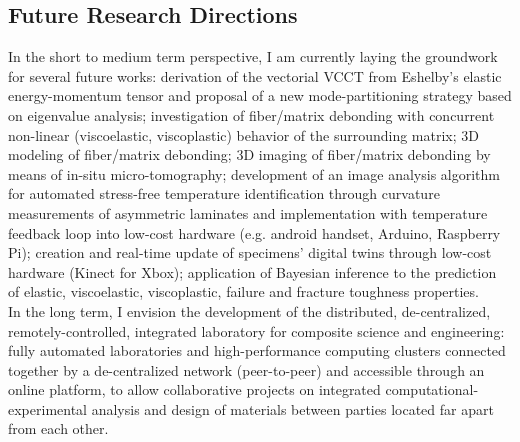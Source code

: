 \documentclass[
  a4paper, 
]{fortysecondscv}
\begin{document}
\subsection{Future Research Directions}
In the short to medium term perspective, I am currently laying the groundwork for several future works: derivation of the vectorial VCCT from Eshelby's elastic energy-momentum tensor and proposal of a new mode-partitioning strategy based on eigenvalue analysis; investigation of fiber/matrix debonding with concurrent non-linear (viscoelastic, viscoplastic) behavior of the surrounding matrix; 3D modeling of fiber/matrix debonding; 3D imaging of fiber/matrix debonding by means of in-situ micro-tomography; development of an image analysis algorithm for automated stress-free temperature identification through curvature measurements of asymmetric laminates and implementation with temperature feedback loop into low-cost hardware (e.g. android handset, Arduino, Raspberry Pi); creation and real-time update of specimens' digital twins through low-cost hardware (Kinect for Xbox); application of Bayesian inference to the prediction of elastic, viscoelastic, viscoplastic, failure and fracture toughness properties.\\
In the long term, I envision the development of the distributed, de-centralized, remotely-controlled, integrated laboratory for composite science and engineering: fully automated laboratories and high-performance computing clusters connected together by a de-centralized network (peer-to-peer) and accessible through an online platform, to allow collaborative projects on integrated computational-experimental analysis and design of materials between parties located far apart from each other.
\end{document}
